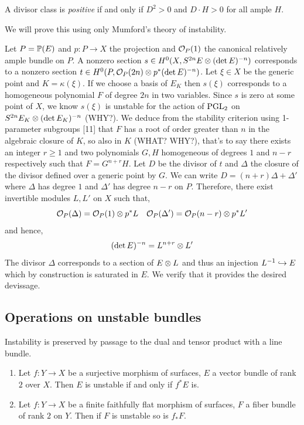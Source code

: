 \documentclass[main.tex]{subfiles}
\begin{document}
\begin{rmk}
A divisor class is \textit{positive} if and only if $D^2 > 0$ and $D \cdot H > 0$ for all ample $H$.
\end{rmk}

We will prove this using only Mumford's theory of instability.
\par
Let $P = \P(E)$ and $p : P \to X$ the projection and $\struct{P}(1)$ the canonical relatively ample bundle on $P$. A nonzero section $s \in H^0(X, S^{2n} E \ot (\det{E})^{-n})$ corresponds to a nonzero section $t \in H^0(P, \struct{P}(2n) \ot p^* (\det{E})^{-n})$. Let $\xi \in X$ be the generic point and $K = \kappa(\xi)$. If we choose a basis of $E_K$ then $s(\xi)$ corresponds to a homogeneous polynomial $F$ of degree $2n$ in two variables. Since $s$ is zero at some point of $X$, we know $s(\xi)$ is unstable for the action of $\PGL_2$ on $S^{2n} E_K \ot (\det{E_K})^{-n}$ (WHY?). We deduce from the stability criterion using 1-parameter subgroups [11] that $F$ has a root of order greater than $n$ in the algebraic closure of $K$, so also in $K$ (WHAT? WHY?), that's to say there exists an integer $r \ge 1$ and two polynomials $G, H$ homogeneous of degrees $1$ and $n-r$ respectively such that $F = G^{n+r} H$. Let $D$ be the divisor of $t$ and $\Delta$ the closure of the divisor defined over a generic point by $G$. We can write $D = (n + r) \Delta + \Delta'$ where $\Delta$ has degree $1$ and $\Delta'$ has degree $n - r$ on $P$. Therefore, there exist invertible modules $L, L'$ on $X$ such that,
\[ \struct{P}(\Delta) = \struct{P}(1) \ot p^* L \quad \struct{P}(\Delta') = \struct{P}(n-r) \ot p^* L' \]
and hence,
\[ (\det{E})^{-n} = L^{n+r} \ot L' \]
The divisor $\Delta$ corresponds to a section of $E \ot L$ and thus an injection $L^{-1} \embed E$ which by construction is saturated in $E$. We verify that it provides the desired devissage.


\subsection{Operations on unstable bundles}

Instability is preserved by passage to the dual and tensor product with a line bundle.

\begin{enumerate}
\item Let $f : Y \to X$ be a surjective morphism of surfaces, $E$ a vector bundle of rank $2$ over $X$. Then $E$ is unstable if and only if $f^* E$ is.

\item Let $f : Y \to X$ be a finite faithfully flat morphism of surfaces, $F$ a fiber bundle of rank $2$ on $Y$. Then if $F$ is unstable so is $f_* F$.
\end{enumerate}
\end{document}
